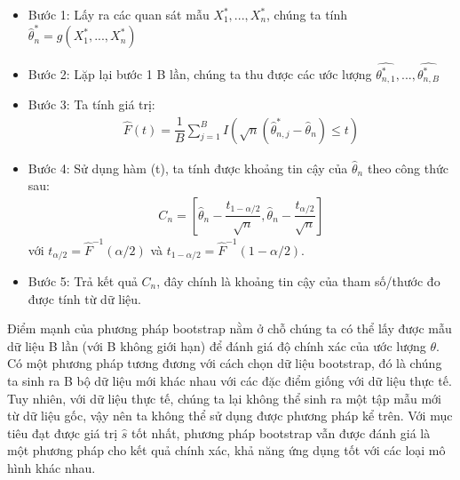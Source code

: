 \documentclass[
]{article}
\providecommand{\tightlist}{%
  \setlength{\itemsep}{0pt}\setlength{\parskip}{0pt}}
\begin{document}
\begin{itemize}
\tightlist
\item
  Bước 1: Lấy ra các quan sát mẫu \(X_1^*, ... , X_n^*\), chúng ta tính \(\hat{\theta}_n^* = g(X_1^*, ... , X_n^*)\)
\item
  Bước 2: Lặp lại bước 1 B lần, chúng ta thu được các ước lượng \(\hat{\theta_{n,1}^*},...,\hat{\theta_{n,B}^*}\)
\item
  Bước 3: Ta tính giá trị:
  \begin{align*}
  \hat{F}(t) = \dfrac{1}{B} \sum\limits_{j = 1}^{B} I(\sqrt{n}(\hat{\theta}_{n,j}^* - \hat{\theta}_n) \leq t)
  \end{align*}
\item
  Bước 4: Sử dụng hàm (t), ta tính được khoảng tin cậy của \(\hat{\theta}_n\) theo công thức sau:
  \begin{align*}
  C_n = \left[ \hat{\theta}_n - \dfrac{t_{1- \alpha/2}}{\sqrt{n}}, \hat{\theta}_n - \dfrac{t_{\alpha/2}}{\sqrt{n}}  \right]
  \end{align*}
  với \(t_{\alpha/2} = \hat{F}^{-1}(\alpha/2)\) và \(t_{1 - \alpha/2} = \hat{F}^{-1}(1 - \alpha/2)\).
\item
  Bước 5: Trả kết quả \(C_n\), đây chính là khoảng tin cậy của tham số/thước đo được tính từ dữ liệu.
\end{itemize}

Điểm mạnh của phương pháp bootstrap nằm ở chỗ chúng ta có thể lấy được mẫu dữ liệu B lần (với B không giới hạn) để đánh giá độ chính xác của ước lượng \(\theta\). Có một phương pháp tương đương với cách chọn dữ liệu bootstrap, đó là chúng ta sinh ra B bộ dữ liệu mới khác nhau với các đặc điểm giống với dữ liệu thực tế. Tuy nhiên, với dữ liệu thực tế, chúng ta lại không thể sinh ra một tập mẫu mới từ dữ liệu gốc, vậy nên ta không thể sử dụng được phương pháp kể trên. Với mục tiêu đạt được giá trị \(\hat{s}\) tốt nhất, phương pháp bootstrap vẫn được đánh giá là một phương pháp cho kết quả chính xác, khả năng ứng dụng tốt với các loại mô hình khác nhau.
\end{document}
